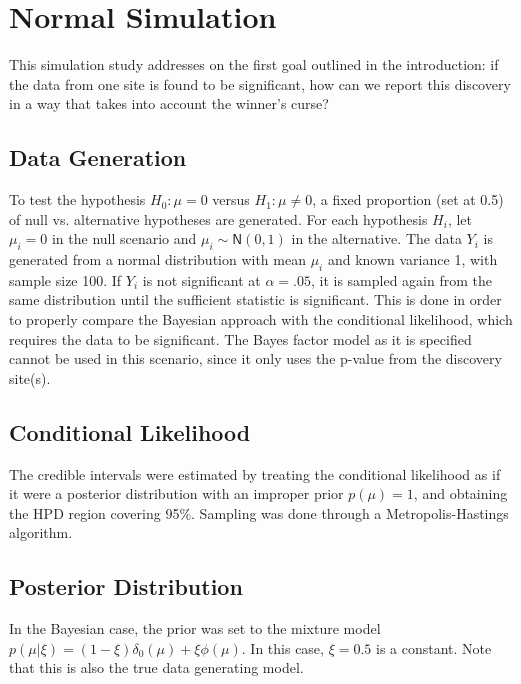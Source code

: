 \documentclass[AMA,STIX1COL]{WileyNJD-v2}\usepackage[]{graphicx}\usepackage[]{color}
\begin{document}
\section{Normal Simulation}\label{sec:normal}

This simulation study addresses on the first goal outlined in the introduction: if the data from one site is found to be significant, how can we report this discovery in a way that takes into account the winner's curse? 

\subsection{Data Generation}

To test the hypothesis $H_0: \mu = 0$ versus  $H_1: \mu \neq 0$, a fixed proportion (set at 0.5) of null vs. alternative hypotheses are generated. For each hypothesis $H_i$, let $\mu_i = 0$ in the null scenario and $\mu_i \sim \textsf{N}(0,1)$ in the alternative. The data $Y_i$ is generated from a normal distribution with mean $\mu_i$ and known variance 1, with sample size 100. If $Y_i$ is not significant at $\alpha = .05$, it is sampled again from the same distribution until the sufficient statistic is significant. This is done in order to properly compare the Bayesian approach with the conditional likelihood, which requires the data to be significant. The Bayes factor model as it is specified cannot be used in this scenario, since it only uses the p-value from the discovery site(s).

\subsection{Conditional Likelihood}

The credible intervals were estimated by treating the conditional likelihood as if it were a posterior distribution with an improper prior $p(\mu) = 1$, and obtaining the HPD region covering 95\%. Sampling was done through a Metropolis-Hastings algorithm.

\subsection{Posterior Distribution}




In the Bayesian case, the prior was set to the mixture model $p(\mu|\xi) = (1-\xi ) \delta_0(\mu)+ \xi\phi(\mu)$. In this case, $\xi = 0.5$ is a constant. Note that this is also the true data generating model. 
\end{document}

